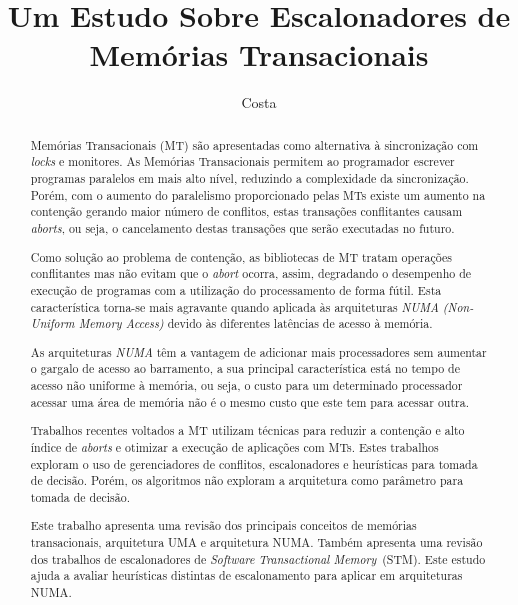 \documentclass[ti]{texufpel}
\title{Um Estudo Sobre Escalonadores de Memórias Transacionais}
\author{Costa}{Michael Alexandre}
\begin{document}
\maketitle

\sloppy

\begin{abstract}

Memórias Transacionais (MT) são apresentadas como alternativa à sincronização com \emph{locks} e monitores. As Memórias Transacionais permitem ao programador escrever programas paralelos em mais alto nível, reduzindo a complexidade da sincronização. Porém, com o aumento do paralelismo proporcionado pelas MTs existe um aumento na contenção gerando maior número de conflitos, estas transações conflitantes causam \emph{aborts}, ou seja, o cancelamento destas transações que serão executadas no futuro.

Como solução ao problema de contenção, as bibliotecas de MT tratam operações conflitantes mas não evitam que o \emph{abort} ocorra, assim, degradando o desempenho de execução de programas com a utilização do processamento de forma fútil. Esta característica torna-se mais agravante quando aplicada às arquiteturas \emph{NUMA} \emph{(Non-Uniform Memory Access)} devido às diferentes latências de acesso à memória.

As arquiteturas \emph{NUMA} têm a vantagem de adicionar mais processadores sem aumentar o gargalo de acesso ao barramento, a sua principal característica está no tempo de acesso não uniforme à memória, ou seja, o custo para um determinado processador acessar uma área de memória não é o mesmo custo que este tem para acessar outra.

Trabalhos recentes voltados a MT utilizam técnicas para reduzir a contenção e alto índice de \emph{aborts} e otimizar a execução de aplicações com MTs. Estes trabalhos exploram o uso de gerenciadores de conflitos, escalonadores e heurísticas para tomada de decisão. Porém, os algoritmos não exploram a arquitetura como parâmetro para tomada de decisão.

Este trabalho apresenta uma revisão dos principais conceitos de memórias transacionais, arquitetura UMA e arquitetura NUMA. Também apresenta uma revisão dos trabalhos de escalonadores de \emph{Software Transactional Memory}~(STM). Este estudo ajuda a avaliar heurísticas distintas de escalonamento para aplicar em arquiteturas NUMA.

\end{abstract}
\end{document}

